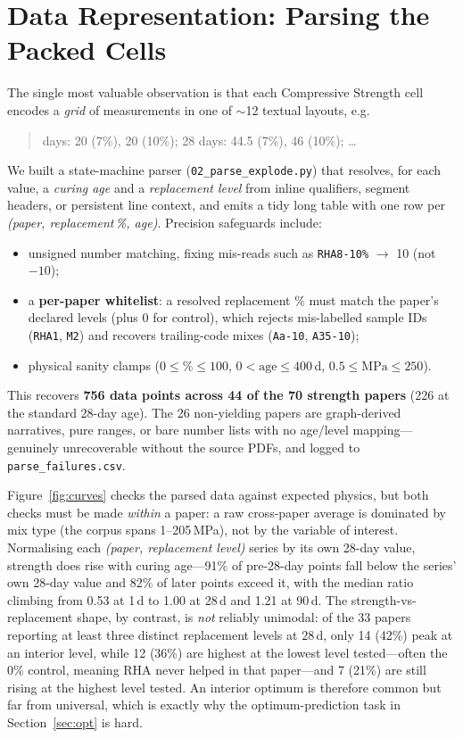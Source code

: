 \documentclass[11pt]{article}
\begin{document}
\section{Data Representation: Parsing the Packed Cells}
The single most valuable observation is that each Compressive Strength cell encodes a
\emph{grid} of measurements in one of $\sim$12 textual layouts, e.g.
\begin{quote}\small{} days: 20 (7\%), 20 (10\%); 28 days: 44.5 (7\%), 46 (10\%); \dots
\end{quote}
We built a state-machine parser (\texttt{02\_parse\_explode.py}) that resolves, for
each value, a \emph{curing age} and a \emph{replacement level} from inline qualifiers,
segment headers, or persistent line context, and emits a tidy long table with one row
per \emph{(paper, replacement\,\%, age)}. Precision safeguards include:
\begin{itemize}\itemsep2pt
  \item unsigned number matching, fixing mis-reads such as \texttt{RHA8-10\%}
        $\rightarrow$ 10 (not $-10$);
  \item a \textbf{per-paper whitelist}: a resolved replacement \% must match the
        paper's declared levels (plus 0 for control), which rejects mis-labelled
        sample IDs (\texttt{RHA1}, \texttt{M2}) and recovers trailing-code mixes
        (\texttt{Aa-10}, \texttt{A35-10});
  \item physical sanity clamps ($0\le\%\le100$, $0<\text{age}\le400$\,d,
        $0.5\le\text{MPa}\le250$).
\end{itemize}
This recovers \textbf{756 data points across 44 of the 70 strength papers} (226 at the
standard 28-day age). The 26 non-yielding papers are graph-derived narratives, pure
ranges, or bare number lists with no age/level mapping---genuinely unrecoverable
without the source PDFs, and logged to \texttt{parse\_failures.csv}.

Figure~\ref{fig:curves} checks the parsed data against expected physics, but both
checks must be made \emph{within} a paper: a raw cross-paper average is dominated by
mix type (the corpus spans 1--205\,MPa), not by the variable of interest. Normalising
each \emph{(paper, replacement level)} series by its own 28-day value, strength does
rise with curing age---91\% of pre-28-day points fall below the series' own 28-day
value and 82\% of later points exceed it, with the median ratio climbing from 0.53 at
1\,d to 1.00 at 28\,d and 1.21 at 90\,d. The strength-vs-replacement shape, by
contrast, is \emph{not} reliably unimodal: of the 33 papers reporting at least three
distinct replacement levels at 28\,d, only 14 (42\%) peak at an interior level, while
12 (36\%) are highest at the lowest level tested---often the 0\% control, meaning RHA
never helped in that paper---and 7 (21\%) are still rising at the highest level tested.
An interior optimum is therefore common but far from universal, which is exactly why
the optimum-prediction task in Section~\ref{sec:opt} is hard.
\end{document}
